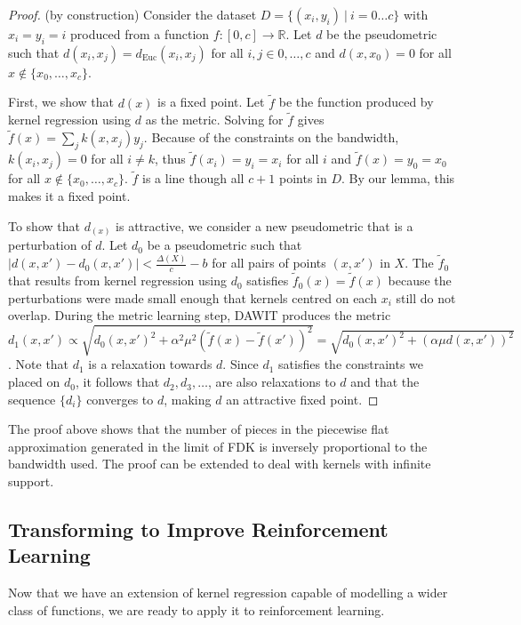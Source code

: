 \documentclass{article} %
\begin{document}
\begin{proof}(by construction)
Consider the dataset $D = \{(x_i,y_i)\ |\ i = 0\ldots c\}$ with $x_i=y_i=i$ produced
from a function $f: [0,c] \to \mathbb{R}$.
Let $d$ be the pseudometric such that $d(x_i, x_j) = d_{\mathrm{Euc}}(x_i, x_j)$
for all $i,j \in {0,\ldots, c}$ and $d(x,x_0) = 0$ for all $x \notin \{x_0, \ldots, x_c\}$.

First, we show that $d(x)$ is a fixed point.
Let $\tilde f$ be the function produced by kernel regression using $d$ as the metric.
Solving for $\tilde f$ gives $\tilde f(x)=\sum_j k(x,x_j)y_j$.
Because of the constraints on the bandwidth, $k(x_i,x_j)=0$ for all $i \neq k$, thus
$\tilde f(x_i) = y_i = x_i$ for all $i$ and $\tilde f(x) = y_0 =x_0$ for all $x \notin \{x_0, \ldots, x_c\}$.
$\tilde f$ is a line though all $c+1$ points in $D$.
By our lemma, this makes it a fixed point.

To show that $d_(x)$ is attractive, we consider a new pseudometric that is a perturbation of $d$.
Let $d_0$ be a pseudometric such that $|d(x,x') - d_0(x,x')| <
\frac{\Delta(X)}{c} - b$ for all pairs of points $(x,x')$ in $X$.
The $\tilde f_0$ that results from kernel regression using $d_0$ satisfies
$\tilde f_0(x) = \tilde f(x)$ because the perturbations were made
small enough that kernels centred on each $x_i$ still do not overlap.
During the metric learning step, DAWIT produces the metric
$d_1(x,x') \propto \sqrt{d_0(x,x')^2 + \alpha^2\mu^2(\tilde f(x) - \tilde f(x'))^2}
= \sqrt{d_0(x,x')^2 + (\alpha\mu d(x,x'))^2}$.
Note that $d_1$ is a relaxation towards $d$.
Since $d_1$ satisfies the constraints we placed on $d_0$, it follows that
$d_2, d_3, \ldots$, are also relaxations to $d$ and that the sequence ${\{d_i\}}$
converges to $d$, making $d$ an attractive fixed point.
\end{proof}

The proof above shows that the number of pieces in the piecewise flat approximation
generated in the limit of FDK is inversely proportional to the bandwidth used.
The proof can be extended to deal with kernels with infinite support.

\subsection{Transforming to Improve Reinforcement Learning}
Now that we have an extension of kernel regression capable of modelling
a wider class of functions, we are ready to apply it to reinforcement learning.
\end{document}
